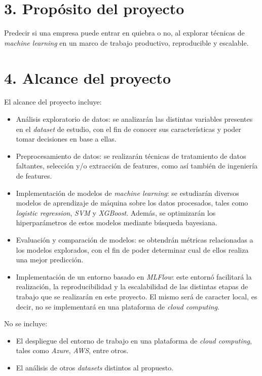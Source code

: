 \documentclass[
11pt, %
]{charter}
\begin{document}
\section{3. Propósito del proyecto}
\label{sec:proposito}

Predecir si una empresa puede entrar en quiebra o no, al explorar técnicas de \textit{machine learning} en un marco de trabajo productivo, reproducible y escalable.

\section{4. Alcance del proyecto}
\label{sec:alcance}

El alcance del proyecto incluye:
\begin{itemize}
	\item Análisis exploratorio de datos: se analizarán las distintas variables presentes en el \textit{dataset} de estudio, con el fin de conocer sus características y poder tomar decisiones en base a ellas.
    \item Preprocesamiento de datos: se realizarán técnicas de tratamiento de datos faltantes, selección y/o extracción de features, como así también de ingeniería de features.
    \item Implementación de modelos de \textit{machine learning}: se estudiarán diversos modelos de aprendizaje de máquina sobre los datos procesados, tales como \textit{logistic regression}, \textit{SVM} y \textit{XGBoost}. Además, se optimizarán los hiperparámetros de estos modelos mediante búsqueda bayesiana.
    \item Evaluación y comparación de modelos: se obtendrán métricas relacionadas a los modelos explorados, con el fin de poder determinar cual de ellos realiza una mejor predicción.
    \item Implementación de un entorno basado en \textit{MLFlow}: este entornó facilitará la realización, la reproducibilidad y la escalabilidad de las distintas etapas de trabajo que se realizarán en este proyecto. El mismo será de caracter local, es decir, no se implementará en una plataforma de \textit{cloud computing}.
\end{itemize}

No se incluye:
\begin{itemize}
    \item El despliegue del entorno de trabajo en una plataforma de \textit{cloud computing}, tales como \textit{Azure}, \textit{AWS}, entre otros.
    \item El análisis de otros \textit{datasets} distintos al propuesto.
\end{itemize}
\end{document}
